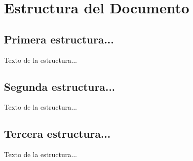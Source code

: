 \section{Estructura del Documento}

\subsection*{Primera estructura...}
    Texto de la estructura...
\subsection*{Segunda estructura...}
    Texto de la estructura...
\subsection*{Tercera estructura...}
    Texto de la estructura...